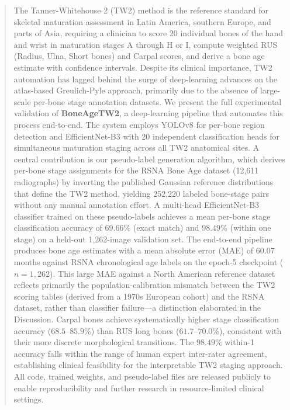 \documentclass[journal]{IEEEtran}
\begin{document}
\begin{abstract}
The Tanner-Whitehouse 2 (TW2) method is the reference standard for
skeletal maturation assessment in Latin America, southern Europe, and
parts of Asia, requiring a clinician to score 20 individual bones of
the hand and wrist in maturation stages A through H or I, compute
weighted RUS (Radius, Ulna, Short bones) and Carpal scores, and
derive a bone age estimate with confidence intervals.
Despite its clinical importance, TW2 automation has lagged behind
the surge of deep-learning advances on the atlas-based
Greulich-Pyle approach, primarily due to the absence of large-scale
per-bone stage annotation datasets.
We present the full experimental validation of \textbf{BoneAgeTW2},
a deep-learning pipeline that automates this process end-to-end.
The system employs YOLOv8 for per-bone region detection and
EfficientNet-B3 with 20 independent classification heads for
simultaneous maturation staging across all TW2 anatomical sites.
A central contribution is our pseudo-label generation algorithm,
which derives per-bone stage assignments for the RSNA Bone Age
dataset (12,611 radiographs) by inverting the published Gaussian
reference distributions that define the TW2 method, yielding
252,220 labeled bone-stage pairs without any manual annotation effort.
A multi-head EfficientNet-B3 classifier trained on these
pseudo-labels achieves a mean per-bone stage classification accuracy
of $\mathbf{69.66\%}$ (exact match) and $\mathbf{98.49\%}$
(within one stage) on a held-out 1,262-image validation set.
The end-to-end pipeline produces bone age estimates with a mean
absolute error (MAE) of $\mathbf{60.07}$ months against RSNA
chronological age labels on the epoch-5 checkpoint ($n{=}1{,}262$).
This large MAE against a North American reference dataset reflects
primarily the population-calibration mismatch between the TW2 scoring
tables (derived from a 1970s European cohort) and the RSNA dataset,
rather than classifier failure---a distinction elaborated in the
Discussion.
Carpal bones achieve systematically higher stage classification
accuracy ($68.5$--$85.9\%$) than RUS long bones ($61.7$--$70.0\%$),
consistent with their more discrete morphological transitions.
The $98.49\%$ within-1 accuracy falls within the range of human
expert inter-rater agreement, establishing clinical feasibility for
the interpretable TW2 staging approach.
All code, trained weights, and pseudo-label files are released
publicly to enable reproducibility and further research in
resource-limited clinical settings.
\end{abstract}
\end{document}
